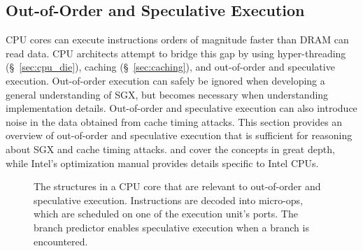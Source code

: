 \subsection{Out-of-Order and Speculative Execution}
\label{sec:out_of_order}

CPU cores can execute instructions orders of magnitude faster than DRAM can
read data. CPU architects attempt to bridge this gap by using hyper-threading
(\S~\ref{sec:cpu_die}), caching (\S~\ref{sec:caching}), and out-of-order and
speculative execution. Out-of-order execution can safely be ignored when
developing a general understanding of SGX, but becomes necessary when
understanding implementation details. Out-of-order and speculative execution
can also introduce noise in the data obtained from cache timing attacks. This
section provides an overview of out-of-order and speculative execution that is
sufficient for reasoning about SGX and cache timing attacks.
\cite{patterson2013architecture} and \cite{hennessy2012architecture} cover the
concepts in great depth, while Intel's optimization manual
\cite{intel2014optimization} provides details specific to Intel CPUs.


\begin{figure}[hbt]
  \caption{
    The structures in a CPU core that are relevant to out-of-order and
    speculative execution. Instructions are decoded into micro-ops, which are
    scheduled on one of the execution unit's ports. The branch predictor
    enables speculative execution when a branch is encountered.
  }
  \label{fig:cpu_out_of_order}
\end{figure}

